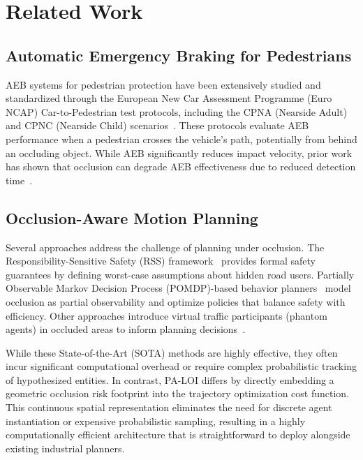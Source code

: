 \documentclass[conference]{IEEEtran}
\begin{document}
\section{Related Work}

\subsection{Automatic Emergency Braking for Pedestrians}
AEB systems for pedestrian protection have been extensively studied and standardized through the European New Car Assessment Programme (Euro NCAP) Car-to-Pedestrian test protocols, including the CPNA (Nearside Adult) and CPNC (Nearside Child) scenarios~\cite{euroncap2023}. These protocols evaluate AEB performance when a pedestrian crosses the vehicle's path, potentially from behind an occluding object. While AEB significantly reduces impact velocity, prior work has shown that occlusion can degrade AEB effectiveness due to reduced detection time~\cite{cicchino2022effects}.

\subsection{Occlusion-Aware Motion Planning}
Several approaches address the challenge of planning under occlusion. The Responsibility-Sensitive Safety (RSS) framework~\cite{shalev2017rss} provides formal safety guarantees by defining worst-case assumptions about hidden road users. Partially Observable Markov Decision Process (POMDP)-based behavior planners~\cite{zhang2021pomdp} model occlusion as partial observability and optimize policies that balance safety with efficiency. Other approaches introduce virtual traffic participants (phantom agents) in occluded areas to inform planning decisions~\cite{schratter2019occlusion}.

While these State-of-the-Art (SOTA) methods are highly effective, they often incur significant computational overhead or require complex probabilistic tracking of hypothesized entities. In contrast, PA-LOI differs by directly embedding a geometric occlusion risk footprint into the trajectory optimization cost function. This continuous spatial representation eliminates the need for discrete agent instantiation or expensive probabilistic sampling, resulting in a highly computationally efficient architecture that is straightforward to deploy alongside existing industrial planners.
\end{document}
